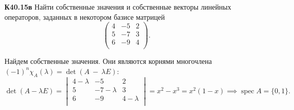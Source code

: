 \documentclass[a4paper]{article}
\newcommand{\spec}{\operatorname{spec}}
\begin{document}
    \begin{enumerate}
    \item[\textbf{К40.15в}]
        Найти собственные значения и собственные векторы линейных операторов, заданных в некотором базисе матрицей
        \begin{equation*}
            \begin{pmatrix}
                4 & -5 & 2 \\
                5 & -7 & 3 \\
                6 & -9 & 4 \\
            \end{pmatrix}.
        \end{equation*}

        \begin{solution}
            Найдем собственные значения. Они являются корнями многочлена $(-1)^n \chi_A(\lambda) = \det(A~-~\lambda E)$:
            \begin{equation*}
                \det(A - \lambda E) = \begin{vmatrix}
                    4 - \lambda & -5 & 2 \\
                    5 & -7 - \lambda & 3 \\
                    6 & -9 & 4 - \lambda \\
                \end{vmatrix}
                = x^2 - x^3 = x^2(1 - x) \implies \spec{A} = \{0, 1\}.
            \end{equation*}


\end{solution}
\end{enumerate}
\end{document}
